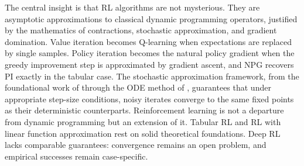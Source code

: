 The central insight is that RL algorithms are not mysterious. They are asymptotic approximations to classical dynamic programming operators, justified by the mathematics of contractions, stochastic approximation, and gradient domination. Value iteration becomes Q-learning \citep{WatkinsDayan1992, tsitsiklis1994} when expectations are replaced by single samples. Policy iteration becomes the natural policy gradient \citep{Kakade2001, agarwal2021theory} when the greedy improvement step is approximated by gradient ascent, and NPG recovers PI exactly in the tabular case. The stochastic approximation framework, from the foundational work of \citet{Robbins1952} through the ODE method of \citet{borkar2000}, guarantees that under appropriate step-size conditions, noisy iterates converge to the same fixed points as their deterministic counterparts. Reinforcement learning is not a departure from dynamic programming but an extension of it. Tabular RL and RL with linear function approximation rest on solid theoretical foundations. Deep RL lacks comparable guarantees: convergence remains an open problem, and empirical successes remain case-specific.

